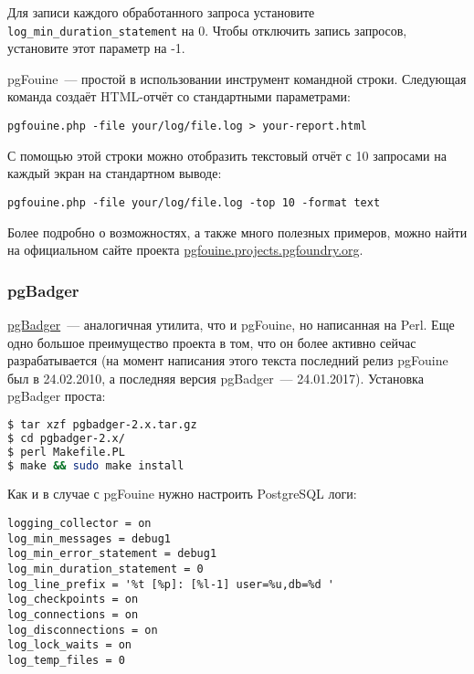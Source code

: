 Для записи каждого обработанного запроса установите \lstinline!log_min_duration_statement! на 0. Чтобы отключить запись запросов, установите этот параметр на -1.

pgFouine~--- простой в использовании инструмент командной строки. Следующая команда создаёт HTML-отчёт со стандартными параметрами:

\begin{lstlisting}[label=lst:sql_performance7,caption=pgFouine]
pgfouine.php -file your/log/file.log > your-report.html
\end{lstlisting}

С помощью этой строки можно отобразить текстовый отчёт с 10 запросами на каждый экран на стандартном выводе:

\begin{lstlisting}[label=lst:sql_performance8,caption=pgFouine]
pgfouine.php -file your/log/file.log -top 10 -format text
\end{lstlisting}

Более подробно о возможностях, а также много полезных примеров, можно найти на официальном сайте проекта \href{http://pgfouine.projects.pgfoundry.org/}{pgfouine.projects.pgfoundry.org}.


\subsubsection{pgBadger}


\href{http://dalibo.github.io/pgbadger/}{pgBadger}~--- аналогичная утилита, что и pgFouine, но написанная на Perl. Еще одно большое преимущество проекта в том, что он более активно сейчас разрабатывается (на момент написания этого текста последний релиз pgFouine был в 24.02.2010, а последняя версия pgBadger~--- 24.01.2017). Установка pgBadger проста:

\begin{lstlisting}[language=Bash,label=lst:sql_performance9,caption=Установка pgBadger]
$ tar xzf pgbadger-2.x.tar.gz
$ cd pgbadger-2.x/
$ perl Makefile.PL
$ make && sudo make install
\end{lstlisting}

Как и в случае с pgFouine нужно настроить PostgreSQL логи:

\begin{lstlisting}[label=lst:sql_performance10,caption=Настройка логов PostgreSQL]
logging_collector = on
log_min_messages = debug1
log_min_error_statement = debug1
log_min_duration_statement = 0
log_line_prefix = '%t [%p]: [%l-1] user=%u,db=%d '
log_checkpoints = on
log_connections = on
log_disconnections = on
log_lock_waits = on
log_temp_files = 0
\end{lstlisting}


